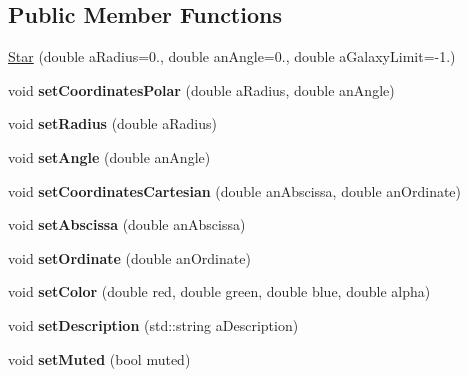 \subsection*{Public Member Functions}
\begin{DoxyCompactItemize}
\item 
\hyperlink{class_star_a1d568f3308c55d5d5d138b606860b722}{Star} (double a\-Radius=0., double an\-Angle=0., double a\-Galaxy\-Limit=-\/1.)
\item 
\hypertarget{class_star_ab4572b2461408ef03d1d56f0b7c9b130}{void {\bfseries set\-Coordinates\-Polar} (double a\-Radius, double an\-Angle)}\label{class_star_ab4572b2461408ef03d1d56f0b7c9b130}

\item 
\hypertarget{class_star_a3dce898ff096b752b1ab57863e8d6622}{void {\bfseries set\-Radius} (double a\-Radius)}\label{class_star_a3dce898ff096b752b1ab57863e8d6622}

\item 
\hypertarget{class_star_a8e27c64ecb1cb2c9ff62372af8ca773a}{void {\bfseries set\-Angle} (double an\-Angle)}\label{class_star_a8e27c64ecb1cb2c9ff62372af8ca773a}

\item 
\hypertarget{class_star_a53f9a513fd6f5cacf8c3061b0c698349}{void {\bfseries set\-Coordinates\-Cartesian} (double an\-Abscissa, double an\-Ordinate)}\label{class_star_a53f9a513fd6f5cacf8c3061b0c698349}

\item 
\hypertarget{class_star_a591fe6d39b454840f336e6c8931f39ff}{void {\bfseries set\-Abscissa} (double an\-Abscissa)}\label{class_star_a591fe6d39b454840f336e6c8931f39ff}

\item 
\hypertarget{class_star_a7b2a9ca158383587cbde89d59eacfa4a}{void {\bfseries set\-Ordinate} (double an\-Ordinate)}\label{class_star_a7b2a9ca158383587cbde89d59eacfa4a}

\item 
\hypertarget{class_star_ad21eb659ca319c555df738d5b17a534a}{void {\bfseries set\-Color} (double red, double green, double blue, double alpha)}\label{class_star_ad21eb659ca319c555df738d5b17a534a}

\item 
\hypertarget{class_star_a5cbe56acf5caf0530baa7e58125f1a90}{void {\bfseries set\-Description} (std\-::string a\-Description)}\label{class_star_a5cbe56acf5caf0530baa7e58125f1a90}

\item 
\hypertarget{class_star_adf6a57bf8cee4c8bf40febbb71dff927}{void {\bfseries set\-Muted} (bool muted)}\label{class_star_adf6a57bf8cee4c8bf40febbb71dff927}


\end{DoxyCompactItemize}

